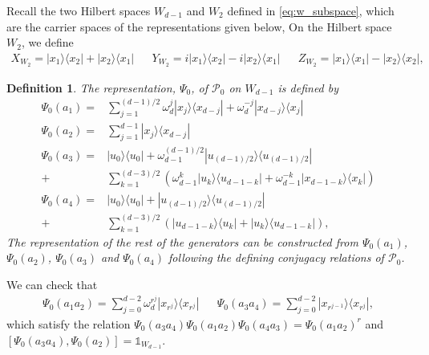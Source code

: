 \documentclass[11pt,letterpaper]{article}
\newcommand{\ketbra}[2]{|#1\rangle\langle#2|}
\newcommand{\1}{\mathbb{1}}
\newcommand{\Pg}{\mathcal{P}}
\newtheorem{definition}[theorem]{Definition}
\theoremstyle{definition}
\begin{document}
Recall the two Hilbert spaces $W_{d-1}$ and $W_2$ defined in \cref{eq:w_subspace}, which are the carrier spaces
of the representations given below,
On the Hilbert space $W_2$, we define
\begin{align*}
	X_{W_2} = \ketbra{x_1}{x_2} + \ketbra{x_2}{x_1} &&
	Y_{W_2} = i\ketbra{x_1}{x_2} - i \ketbra{x_2}{x_1} &&
	Z_{W_2} = \ketbra{x_1}{x_1} - \ketbra{x_2}{x_2},
\end{align*}
\begin{definition}
\label{def:rep_g0}
The representation, $\Psi_0$, of $\Pg_0$ on $W_{d-1}$ is defined by
\begin{align*}
	\Psi_0(a_1) =&\sum_{j=1}^{(d-1)/2} \omega_d^j \ketbra{x_j}{x_{d-j}} + \omega_d^{-j} \ketbra{x_{d-j}}{x_{j}} \\
	\Psi_0(a_2) = &\sum_{j=1}^{d-1} \ketbra{x_j}{x_{d-j}}\\
	\Psi_0(a_3) = &\ketbra{u_0}{u_0} +\omega_{d-1}^{(d-1)/2}\ketbra{u_{(d-1)/2}}{u_{(d-1)/2}}\\ + 
	&\sum_{k=1}^{(d-3)/2}\left( \omega_{d-1}^k\ketbra{u_k}{u_{d-1-k}} + \omega_{d-1}^{-k}\ketbra{x_{d-1-k}}{x_k}\right)\\ 
	\Psi_0(a_4) = &\ketbra{u_0}{u_0} +\ketbra{u_{(d-1)/2}}{u_{(d-1)/2}} \\+
	 &\sum_{k=1}^{(d-3)/2}\left(\ketbra{u_{d-1-k}}{u_k} + \ketbra{u_k}{u_{d-1-k}}\right),
\end{align*}
The representation of the rest of the generators
can be constructed from $\Psi_0(a_1)$, $\Psi_0(a_2)$, $\Psi_0(a_3)$ and $\Psi_0(a_4)$ following the defining 
conjugacy relations of $\Pg_0$.
\end{definition}
We can check that
\begin{align*}
	\Psi_0(a_1a_2) =  \sum_{j=0}^{d-2} \omega_d^{r^j} \ketbra{x_{r^j}}{x_{r^j}} &&
	\Psi_0(a_3a_4) =  \sum_{j=0}^{d-2} \ketbra{x_{r^{j-1}}}{x_{r^j}},
\end{align*}
which satisfy the relation $\Psi_0(a_3a_4) \Psi_0(a_1a_2) \Psi_0(a_4a_3) = \Psi_0(a_1a_2)^r$ and
$[\Psi_0(a_3a_4), \Psi_0(a_2)] = \1_{W_{d-1}}$. 
\end{document}
